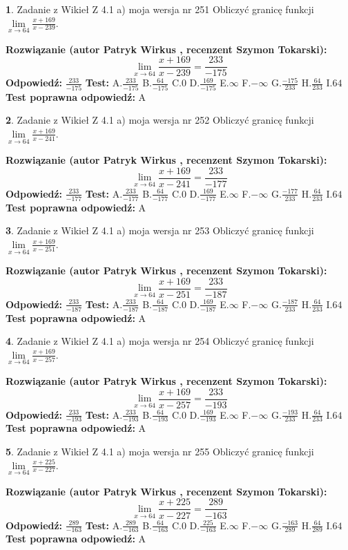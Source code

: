 \documentclass[12pt, a4paper]{article}
\theoremstyle{definition} %
\newtheorem{zad}{}
\newcommand{\zadStart}[1]{\begin{zad}#1\newline}
\newcommand{\zadStop}{\end{zad}}
\newcommand{\rozwStart}[2]{\noindent \textbf{Rozwiązanie (autor #1 , recenzent #2): }\newline}
\newcommand{\rozwStop}{\newline}
\newcommand{\odpStart}{\noindent \textbf{Odpowiedź:}\newline}
\newcommand{\odpStop}{\newline}
\newcommand{\testStart}{\noindent \textbf{Test:}\newline}
\newcommand{\testStop}{\newline}
\newcommand{\kluczStart}{\noindent \textbf{Test poprawna odpowiedź:}\newline}
\newcommand{\kluczStop}{\newline}
\begin{document}
\zadStart{Zadanie z Wikieł Z 4.1 a) moja wersja nr 251}
Obliczyć granicę funkcji $\lim\limits_{x\to64}\frac{x+169}{x-239}$.
\zadStop
\rozwStart{Patryk Wirkus}{Szymon Tokarski}
$$\lim\limits_{x\to64}\frac{x+169}{x-239} = \frac{233}{-175}$$
\rozwStop
\odpStart
$\frac{233}{-175}$
\odpStop
\testStart
A.$\frac{233}{-175}$
B.$\frac{64}{-175}$
C.$0$
D.$\frac{169}{-175}$
E.$\infty$
F.$-\infty$
G.$\frac{-175}{233}$
H.$\frac{64}{233}$
I.$64$
\testStop
\kluczStart
A
\kluczStop



\zadStart{Zadanie z Wikieł Z 4.1 a) moja wersja nr 252}
Obliczyć granicę funkcji $\lim\limits_{x\to64}\frac{x+169}{x-241}$.
\zadStop
\rozwStart{Patryk Wirkus}{Szymon Tokarski}
$$\lim\limits_{x\to64}\frac{x+169}{x-241} = \frac{233}{-177}$$
\rozwStop
\odpStart
$\frac{233}{-177}$
\odpStop
\testStart
A.$\frac{233}{-177}$
B.$\frac{64}{-177}$
C.$0$
D.$\frac{169}{-177}$
E.$\infty$
F.$-\infty$
G.$\frac{-177}{233}$
H.$\frac{64}{233}$
I.$64$
\testStop
\kluczStart
A
\kluczStop



\zadStart{Zadanie z Wikieł Z 4.1 a) moja wersja nr 253}
Obliczyć granicę funkcji $\lim\limits_{x\to64}\frac{x+169}{x-251}$.
\zadStop
\rozwStart{Patryk Wirkus}{Szymon Tokarski}
$$\lim\limits_{x\to64}\frac{x+169}{x-251} = \frac{233}{-187}$$
\rozwStop
\odpStart
$\frac{233}{-187}$
\odpStop
\testStart
A.$\frac{233}{-187}$
B.$\frac{64}{-187}$
C.$0$
D.$\frac{169}{-187}$
E.$\infty$
F.$-\infty$
G.$\frac{-187}{233}$
H.$\frac{64}{233}$
I.$64$
\testStop
\kluczStart
A
\kluczStop



\zadStart{Zadanie z Wikieł Z 4.1 a) moja wersja nr 254}
Obliczyć granicę funkcji $\lim\limits_{x\to64}\frac{x+169}{x-257}$.
\zadStop
\rozwStart{Patryk Wirkus}{Szymon Tokarski}
$$\lim\limits_{x\to64}\frac{x+169}{x-257} = \frac{233}{-193}$$
\rozwStop
\odpStart
$\frac{233}{-193}$
\odpStop
\testStart
A.$\frac{233}{-193}$
B.$\frac{64}{-193}$
C.$0$
D.$\frac{169}{-193}$
E.$\infty$
F.$-\infty$
G.$\frac{-193}{233}$
H.$\frac{64}{233}$
I.$64$
\testStop
\kluczStart
A
\kluczStop



\zadStart{Zadanie z Wikieł Z 4.1 a) moja wersja nr 255}
Obliczyć granicę funkcji $\lim\limits_{x\to64}\frac{x+225}{x-227}$.
\zadStop
\rozwStart{Patryk Wirkus}{Szymon Tokarski}
$$\lim\limits_{x\to64}\frac{x+225}{x-227} = \frac{289}{-163}$$
\rozwStop
\odpStart
$\frac{289}{-163}$
\odpStop
\testStart
A.$\frac{289}{-163}$
B.$\frac{64}{-163}$
C.$0$
D.$\frac{225}{-163}$
E.$\infty$
F.$-\infty$
G.$\frac{-163}{289}$
H.$\frac{64}{289}$
I.$64$
\testStop
\kluczStart
A
\kluczStop
\end{document}
